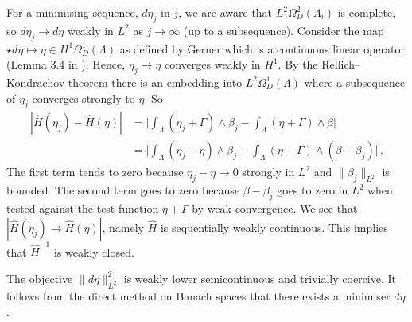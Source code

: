 \documentclass[11pt]{article}
\theoremstyle{plain}
\theoremstyle{definition}
\theoremstyle{remark}
\newcommand{\ST}{\Lambda}
\begin{document}
For a minimising sequence, \( d \eta_j \) in \(j\), we are aware that \(L^2 \Omega^2_D(\ST_i)\) is complete, so \(d \eta_j \to d \eta\) weakly in \(L^2\) as \(j \to \infty\) (up to a subsequence). Consider the map \(\star d \eta \mapsto \eta \in H^1 \Omega^1_D(\ST)\) as defined by Gerner which is a continuous linear operator (Lemma 3.4 in \cite{exist_gerner}). Hence, \( \eta_j \to  \eta\) converges weakly in \(H^1\). By the Rellich–Kondrachov theorem there is an embedding into  \(L^2 \Omega^1_D(\ST)\) where a subsequence of \(  \eta_j\) converges strongly to \(\eta\). So
\begin{align*}
    |\hat H  (   \eta_j ) - \hat H  (   \eta )| &= \bigg| \int_{\ST} \left(   \eta_j + \Gamma \right)  \wedge \beta _j
    - 
    \int_{\ST} \left(   \eta +  \Gamma \right)  \wedge \beta  \bigg| 
    \\
      &= \bigg| \int_{\ST} \left(   \eta_j - \eta \right)  \wedge \beta _j 
    - 
    \int_{\ST} \left(   \eta +  \Gamma \right)  \wedge  (\beta - \beta_j) \bigg| \, .
\end{align*}
The first term tends to zero because \( \eta_j - \eta \to 0\) strongly in \(L^2\) and \( \| \beta_j \|_{L^2}\) is bounded. The second term goes to zero because \(\beta - \beta_j\) goes to zero in \(L^2\) when tested against the test function \(\eta +  \Gamma  \) by weak convergence. We see that \(|\hat H  (   \eta_j ) \to \hat H  (   \eta )| \), namely \(\hat H\) is sequentially weakly continuous. This implies that \(\hat H^{-1}\) is weakly closed.


The objective \(\| d \eta  \|_{L^2}^2\) is weakly lower semicontinuous and trivially coercive. It follows from the direct method on Banach spaces that there exists a minimiser \(d \eta\).
\end{document}
